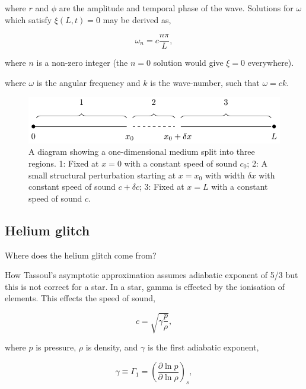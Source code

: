 where \(r\) and \(\phi\) are the amplitude and temporal phase of the wave. Solutions for \(\omega\) which satisfy \(\xi(L, t)=0\) may be derived as,

\begin{equation}
    \omega_n = c \frac{n \pi}{L},
\end{equation}

where \(n\) is a non-zero integer (the \(n=0\) solution would give \(\xi=0\) everywhere).

where \(\omega\) is the angular frequency and \(k\) is the wave-number, such that \(\omega = c k\).

\begin{figure}
    \centering
    \includegraphics{figures/glitch-1d-example-diagram.pdf}
    \caption[A diagram showing a one-dimensional medium with a small structural perturbation.]{A diagram showing a one-dimensional medium split into three regions. 1: Fixed at \(x=0\) with a constant speed of sound \(c_0\); 2: A small structural perturbation starting at \(x=x_0\) with width \(\delta x\) with constant speed of sound \(c + \delta c\); 3: Fixed at \(x=L\) with a constant speed of sound \(c\).}
    \label{fig:1d-diagram}
\end{figure}




\subsection{Helium glitch}\label{sec:helium-glitch}

Where does the helium glitch come from?

How Tassoul's asymptotic approximation assumes adiabatic exponent of 5/3 but this is not correct for a star. In a star, gamma is effected by the ionisation of elements. This effects the speed of sound,

\begin{equation}
    c = \sqrt{\gamma \frac{p}{\rho}},
\end{equation}

where \(p\) is pressure, \(\rho\) is density, and \(\gamma\) is the first adiabatic exponent,

\begin{equation}
    \gamma \equiv \Gamma_1 = \left( \frac{\partial \ln p}{\partial \ln \rho} \right)_s,
\end{equation}

